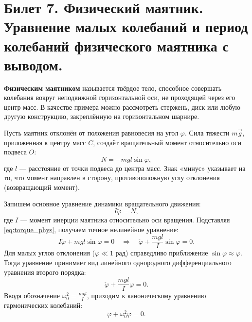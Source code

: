 \section{Билет 7. Физический маятник. Уравнение малых колебаний и период колебаний физического маятника с выводом.}

\begin{definition}
\textbf{Физическим маятником} называется твёрдое тело, способное совершать колебания вокруг неподвижной горизонтальной оси, не проходящей через его центр масс. В качестве примера можно рассмотреть стержень, диск или любую другую конструкцию, закреплённую на горизонтальном шарнире.
\end{definition}

\begin{theorem}
Пусть маятник отклонён от положения равновесия на угол $\varphi$. Сила тяжести $m\vec{g}$, приложенная к центру масс $C$, создаёт вращательный момент относительно оси подвеса $O$:
\begin{equation}
    N = -mgl \sin\varphi, \label{eq:torque_phys}
\end{equation}
где $l$ --- расстояние от точки подвеса до центра масс. Знак «минус» указывает на то, что момент направлен в сторону, противоположную углу отклонения (возвращающий момент).

Запишем основное уравнение динамики вращательного движения:
\begin{equation}
    I \ddot{\varphi} = N,
\end{equation}
где $I$ --- момент инерции маятника относительно оси вращения. Подставляя \eqref{eq:torque_phys}, получаем точное нелинейное уравнение:
\begin{equation}
    I \ddot{\varphi} + mgl \sin\varphi = 0 \quad \Rightarrow \quad \ddot{\varphi} + \frac{mgl}{I} \sin\varphi = 0.
\end{equation}
Для малых углов отклонения ($\varphi \ll 1$ рад) справедливо приближение $\sin\varphi \approx \varphi$. Тогда уравнение принимает вид линейного однородного дифференциального уравнения второго порядка:
\begin{equation}
    \ddot{\varphi} + \frac{mgl}{I} \varphi = 0. \label{eq:small_phys}
\end{equation}
Вводя обозначение $\omega_0^2 = \frac{mgl}{I}$, приходим к каноническому уравнению гармонических колебаний:
\begin{equation}
    \ddot{\varphi} + \omega_0^2 \varphi = 0.
\end{equation}
\end{theorem}

